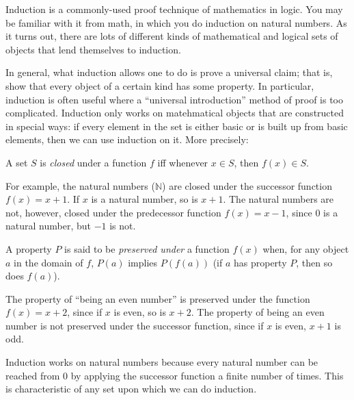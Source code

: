 \documentclass[../../include/open-logic-section]{subfiles}
\begin{document}


\begin{explain}
Induction is a commonly-used proof technique of mathematics in logic.
You may be familiar with it from math, in which you do induction on
natural numbers. As it turns out, there are lots of different kinds of
mathematical and logical sets of objects that lend themselves to induction.

In general, what induction allows one to do is prove a universal claim; that
is, show that every object of a certain kind has some property. In particular,
induction is often useful where a ``universal introduction'' method of proof
is too complicated. Induction only works on matehmatical objects that are
constructed in special ways: if every element in the set is either basic or is
built up from basic elements, then we can use induction on it. More precisely:
\end{explain}

\begin{defn}
A set $S$ is \emph{closed} under a function $f$ iff whenever $x \in
S$, then $f(x) \in S$.
\end{defn}

\begin{explain}
For example, the natural numbers ($\mathbb{N}$) are closed under the
successor function $f(x) = x+1$. If $x$ is a natural number, so is
$x+1$. The natural numbers are not, however, closed under the
predecessor function $f(x) = x-1$, since $0$ is a natural number, but
$-1$ is not.
\end{explain}

\begin{defn}
A property $P$ is said to be \emph{preserved under} a function $f(x)$
when, for any object $a$ in the domain of $f$, $P(a)$ implies
$P(f(a))$ (if $a$ has property $P$, then so does $f(a)$).
\end{defn}

\begin{explain}
The property of ``being an even number'' is preserved under the
function $f(x) = x+2$, since if $x$ is even, so is $x+2$. The property
of being an even number is not preserved under the successor function,
since if $x$ is even, $x+1$ is odd.

Induction works on natural numbers because every natural number can be
reached from 0 by applying the successor function a finite number of
times. This is characteristic of any set upon which we can do
induction.
\end{explain}
\end{document}
